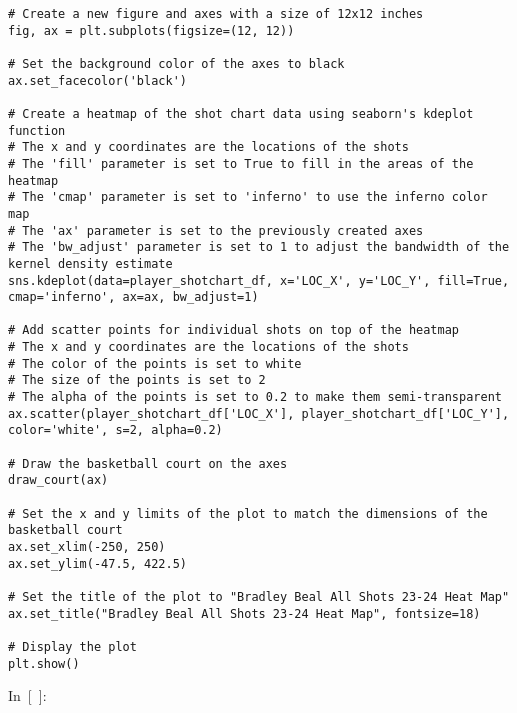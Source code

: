 \begin{verbatim}
# Create a new figure and axes with a size of 12x12 inches
fig, ax = plt.subplots(figsize=(12, 12))

# Set the background color of the axes to black
ax.set_facecolor('black')

# Create a heatmap of the shot chart data using seaborn's kdeplot function
# The x and y coordinates are the locations of the shots
# The 'fill' parameter is set to True to fill in the areas of the heatmap
# The 'cmap' parameter is set to 'inferno' to use the inferno color map
# The 'ax' parameter is set to the previously created axes
# The 'bw_adjust' parameter is set to 1 to adjust the bandwidth of the kernel density estimate
sns.kdeplot(data=player_shotchart_df, x='LOC_X', y='LOC_Y', fill=True, cmap='inferno', ax=ax, bw_adjust=1)

# Add scatter points for individual shots on top of the heatmap
# The x and y coordinates are the locations of the shots
# The color of the points is set to white
# The size of the points is set to 2
# The alpha of the points is set to 0.2 to make them semi-transparent
ax.scatter(player_shotchart_df['LOC_X'], player_shotchart_df['LOC_Y'], color='white', s=2, alpha=0.2)

# Draw the basketball court on the axes
draw_court(ax)

# Set the x and y limits of the plot to match the dimensions of the basketball court
ax.set_xlim(-250, 250)
ax.set_ylim(-47.5, 422.5)

# Set the title of the plot to "Bradley Beal All Shots 23-24 Heat Map"
ax.set_title("Bradley Beal All Shots 23-24 Heat Map", fontsize=18)

# Display the plot
plt.show()
\end{verbatim}

In~{[}~{]}:

